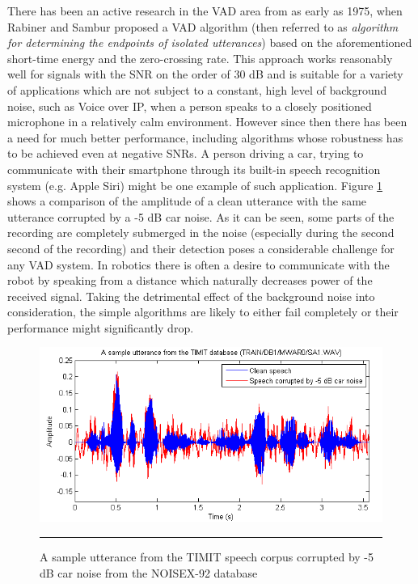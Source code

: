There has been an active research in the VAD area from as early as 1975, when Rabiner and Sambur \cite{RabinerSambur} proposed a VAD algorithm (then referred to as \emph{algorithm for determining the endpoints of isolated utterances}) based on the aforementioned short-time energy and the zero-crossing rate. This approach works reasonably well for signals with the SNR on the order of 30 dB and is suitable for a variety of applications which are not subject to a constant, high level of background noise, such as Voice over IP, when a person speaks to a closely positioned microphone in a relatively calm environment. However since then there has been a need for much better performance, including algorithms whose robustness has to be achieved even at negative SNRs. A person driving a car, trying to communicate with their smartphone through its built-in speech recognition system (e.g. Apple Siri) might be one example of such application. Figure \ref{fig:corruptedSpeech} shows a comparison of the amplitude of a clean utterance with the same utterance corrupted by a -5 dB car noise. As it can be seen, some parts of the recording are completely submerged in the noise (especially during the second second of the recording) and their detection poses a considerable challenge for any VAD system. In robotics there is often a desire to communicate with the robot by speaking from a distance which naturally decreases power of the received signal. Taking the detrimental effect of the background noise into consideration, the simple algorithms are likely to either fail completely or their performance might significantly drop.

\begin{figure}[htbp]
	\centering
		\includegraphics[width=0.9\columnwidth]{Figures/corruptedSpeech.png}
		\rule{37em}{0.5pt}
	\caption[A sample utterance corrupted by -5 dB car noise]{A sample utterance from the TIMIT speech corpus corrupted by -5 dB car noise from the NOISEX-92 database}
	\label{fig:corruptedSpeech}
\end{figure}

